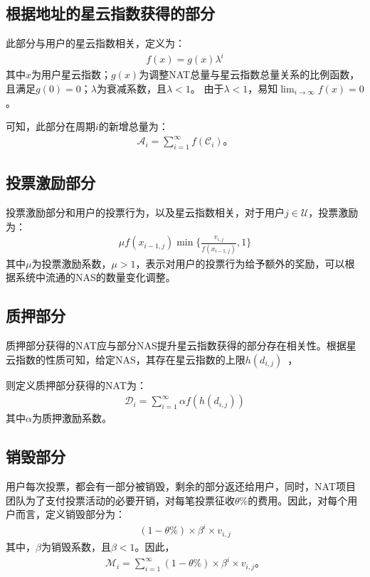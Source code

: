 \subsection{根据地址的星云指数获得的部分}
此部分与用户的星云指数相关，定义为：
\begin{align}
    f(x) = g(x)\lambda^i
\end{align}
\noindent 其中$x$为用户星云指数；$g(x)$为调整NAT总量与星云指数总量关系的比例函数，且满足$g(0) = 0$；$\lambda$为衰减系数，且$\lambda < 1$。
由于$\lambda < 1$，易知$\lim_{i\to \infty}f(x) = 0$。

可知，此部分在周期$i$的新增总量为：
\begin{align}
\mathcal{A}_i = \sum_{i=1}^{\infty}f(\mathcal{C}_i)。
\end{align}

\subsection{投票激励部分}
投票激励部分和用户的投票行为，以及星云指数相关，对于用户$j \in \mathcal{U}$，投票激励为：
\begin{align}
\mu f(x_{i-1,j}) \min\{\frac{v_{i,j}}{f(x_{i-1,j})},1\}
\end{align}
\noindent 其中$\mu$为投票激励系数，$\mu > 1$，表示对用户的投票行为给予额外的奖励，可以根据系统中流通的NAS的数量变化调整。

\subsection{质押部分}
质押部分获得的NAT应与部分NAS提升星云指数获得的部分存在相关性。根据星云指数的性质可知，给定NAS，其存在星云指数的上限$h(d_{i,j})$~\cite{ImproveNR}，

则定义质押部分获得的NAT为：
\begin{align}
\mathcal{D}_i = \sum_{i=1}^{\infty}\alpha f(h(d_{i,j}))
\end{align}
\noindent 其中$\alpha$为质押激励系数。


\subsection{销毁部分}
\label{burn}
用户每次投票，都会有一部分被销毁，剩余的部分返还给用户，同时，NAT项目团队为了支付投票活动的必要开销，对每笔投票征收$\theta\%$的费用。因此，对每个用户而言，定义销毁部分为：
\begin{align}
(1-\theta\%) \times \beta^i \times v_{i,j}
\end{align}
\noindent 其中，$\beta$为销毁系数，且$\beta < 1$。因此，
\begin{align}
    \mathcal{M}_i = \sum_{i=1}^{\infty} (1-\theta\%) \times \beta^i \times v_{i,j} 。
\end{align}

